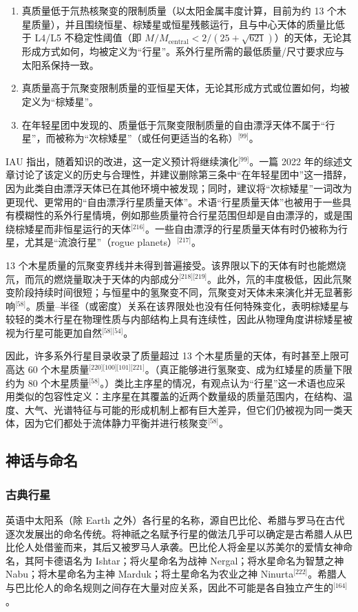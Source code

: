 \begin{enumerate}
\item 真质量低于氘热核聚变的限制质量（以太阳金属丰度计算，目前为约 13 个木星质量），并且围绕恒星、棕矮星或恒星残骸运行，且与中心天体的质量比低于 L4/L5 不稳定性阈值（即 $M/M_{\text{central}} < 2/(25+\sqrt{621})$）的天体，无论其形成方式如何，均被定义为“行星”。系外行星所需的最低质量/尺寸要求应与太阳系保持一致。
\item 真质量高于氘聚变限制质量的亚恒星天体，无论其形成方式或位置如何，均被定义为“棕矮星”。
\item 在年轻星团中发现的、质量低于氘聚变限制质量的自由漂浮天体不属于“行星”，而被称为“次棕矮星”（或任何更适当的名称）\(^\text{[99]}\)。
\end{enumerate}
IAU 指出，随着知识的改进，这一定义预计将继续演化\(^\text{[99]}\)。一篇 2022 年的综述文章讨论了该定义的历史与合理性，并建议删除第三条中“在年轻星团中”这一措辞，因为此类自由漂浮天体已在其他环境中被发现；同时，建议将“次棕矮星”一词改为更现代、更常用的“自由漂浮行星质量天体”。术语“行星质量天体”也被用于一些具有模糊性的系外行星情境，例如那些质量符合行星范围但却是自由漂浮的，或是围绕棕矮星而非恒星运行的天体\(^\text{[216]}\)。一些自由漂浮的行星质量天体有时仍被称为行星，尤其是“流浪行星”（rogue planets）\(^\text{[217]}\)。

13 个木星质量的氘聚变界线并未得到普遍接受。该界限以下的天体有时也能燃烧氘，而氘的燃烧量取决于天体的内部成分\(^\text{[218][219]}\)。此外，氘的丰度极低，因此氘聚变阶段持续时间很短；与恒星中的氢聚变不同，氘聚变对天体未来演化并无显著影响\(^\text{[58]}\)。质量–半径（或密度）关系在该界限处也没有任何特殊变化，表明棕矮星与较轻的类木行星在物理性质与内部结构上具有连续性，因此从物理角度讲棕矮星被视为行星可能更加自然\(^\text{[58][54]}\)。

因此，许多系外行星目录收录了质量超过 13 个木星质量的天体，有时甚至上限可高达 60 个木星质量\(^\text{[220][100][101][221]}\)。（真正能够进行氢聚变、成为红矮星的质量下限约为 80 个木星质量\(^\text{[58]}\)。）类比主序星的情况，有观点认为“行星”这一术语也应采用类似的包容性定义：主序星在其覆盖的近两个数量级的质量范围内，在结构、温度、大气、光谱特征与可能的形成机制上都有巨大差异，但它们仍被视为同一类天体，因为它们都处于流体静力平衡并进行核聚变\(^\text{[58]}\)。
\subsection{神话与命名}
\subsubsection{古典行星}
英语中太阳系（除 Earth 之外）各行星的名称，源自巴比伦、希腊与罗马在古代逐次发展出的命名传统。将神祇之名赋予行星的做法几乎可以确定是古希腊人从巴比伦人处借鉴而来，其后又被罗马人承袭。巴比伦人将金星以苏美尔的爱情女神命名，其阿卡德语名为 Ishtar；将火星命名为战神 Nergal；将水星命名为智慧之神 Nabu；将木星命名为主神 Marduk；将土星命名为农业之神 Ninurta\(^\text{[222]}\)。希腊人与巴比伦人的命名规则之间存在大量对应关系，因此不可能是各自独立产生的\(^\text{[164]}\)。

